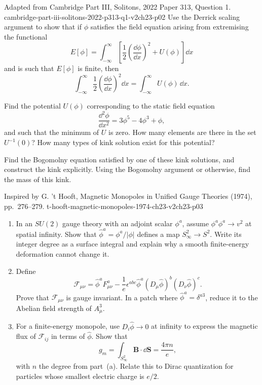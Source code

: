 \begin{enumerate}
  {Adapted from Cambridge Part III, Solitons, 2022 Paper 313,
  Question 1.}
  {cambridge-part-iii-solitons-2022-p313-q1-v2ch23-p02}
  Use the Derrick scaling argument to show that if \(\phi\) satisfies the
  field equation arising from extremising the functional
  \[
    E[\phi]=\int_{-\infty}^{\infty}
      \left[\frac12\left(\frac{\dd\phi}{\dd x}\right)^2+U(\phi)\right]\dd x
  \]
  and is such that \(E[\phi]\) is finite, then
  \[
    \int_{-\infty}^{\infty}
      \frac12\left(\frac{\dd\phi}{\dd x}\right)^2\dd x
      =\int_{-\infty}^{\infty}U(\phi)\,\dd x.
  \]

  Find the potential \(U(\phi)\) corresponding to the static field
  equation
  \[
    \frac{\dd^2\phi}{\dd x^2}=3\phi^5-4\phi^3+\phi,
  \]
  and such that the minimum of \(U\) is zero.  How many elements are
  there in the set \(U^{-1}(0)\)?  How many types of kink solution exist
  for this potential?

  Find the Bogomolny equation satisfied by one of these kink solutions,
  and construct the kink explicitly.  Using the Bogomolny argument or
  otherwise, find the mass of this kink.

  {Inspired by G. 't Hooft, Magnetic Monopoles in Unified Gauge
  Theories (1974), pp.~276--279.}
  {t-hooft-magnetic-monopoles-1974-ch23-v2ch23-p03}
  \begin{enumerate}
    \item[(a)]
    In an \(SU(2)\) gauge theory with an adjoint scalar
    \(\phi^a\), assume \(\phi^a\phi^a\to v^2\) at spatial infinity.
    Show that \(\widehat\phi^a=\phi^a/\lvert\phi\rvert\) defines a map
    \(S^2_\infty\to S^2\).  Write its integer degree as a surface
    integral and explain why a smooth finite-energy deformation cannot
    change it.
    \item[(b)]
    Define
    \[
      \mathcal F_{\mu\nu}
        =\widehat\phi^aF_{\mu\nu}^a
         -\frac1e\epsilon^{abc}\widehat\phi^a
          (D_\mu\widehat\phi)^b(D_\nu\widehat\phi)^c .
    \]
    Prove that \(\mathcal F_{\mu\nu}\) is gauge invariant.  In a patch
    where \(\widehat\phi^a=\delta^{a3}\), reduce it to the Abelian field
    strength of \(A_\mu^3\).
    \item[(c)]
    For a finite-energy monopole, use \(D_i\widehat\phi\to0\) at infinity
    to express the magnetic flux of \(\mathcal F_{ij}\) in terms of
    \(\widehat\phi\).  Show that
    \[
      g_m=\int_{S^2_\infty}\mathbf B\cdot \dd\mathbf S
         =\frac{4\pi n}{e},
    \]
    with \(n\) the degree from part~(a).  Relate this to Dirac
    quantization for particles whose smallest electric charge is \(e/2\).
  \end{enumerate}


\end{enumerate}
